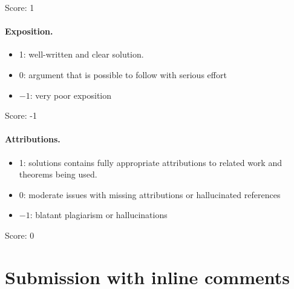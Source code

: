 \documentclass[11pt]{article}
\theoremstyle{remark}
\begin{document}
\noindent Score: 1

\paragraph{Exposition.}
\begin{itemize}
	\item  1: well-written and clear solution.
	\item  0: argument that is possible to follow with serious effort
	\item  $-1$: very poor exposition
\end{itemize}

\noindent Score: -1

\paragraph{Attributions.}
\begin{itemize}
	\item  1: solutions contains fully appropriate attributions
		to related work and theorems being used.
	\item  0: moderate issues with missing attributions or hallucinated references
	\item  $-1$: blatant plagiarism or hallucinations
\end{itemize}

\noindent Score: 0

\newpage
\section{Submission with inline comments}


\begin{abstract}
Over a field, a triple with sum zero satisfies the identity
$x^3+y^3+z^3=3xyz$. We show that the corresponding implication for
hyperaddition fails in general, even when the three copies of $-xyz$ are
kept as separate summands. We construct a countably infinite hyperfield
with infinite cyclic multiplicative group in which $(1,g,g^4)$ is a
counterexample. The construction uses translates of a subset of the
integers representing each nonzero integer uniquely as an ordered
difference. We prove the required incidence properties and all
hyperfield axioms directly. We also prove that the implication holds
for quotients of fields, for triples with a singleton pairwise
hypersum, and, under $-1=1$, for triples with equal squares.
\end{abstract}
\end{document}
